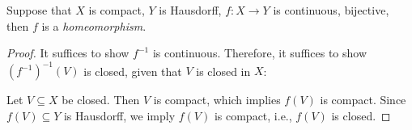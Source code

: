 \begin{theorem}
Suppose that $X$ is compact, $Y$ is Hausdorff, $f:X\to Y$ is continuous, bijective, then $f$ is a \emph{homeomorphism}.
\end{theorem}
\begin{proof}
It suffices to show $f^{-1}$ is continuous.
Therefore, it suffices to show $(f^{-1})^{-1}(V)$ is closed, given that $V$ is closed in $X$:

Let $V\subseteq X$ be closed. Then $V$ is compact, which implies $f(V)$ is compact. 
Since $f(V)\subseteq Y$ is Hausdorff, we imply $f(V)$ is compact, i.e., $f(V)$ is closed.
\end{proof}



















